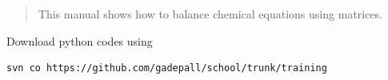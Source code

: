 \documentclass[journal,12pt,twocolumn]{IEEEtran}
\renewcommand\thesection{\arabic{section}}
\begin{document}
%

\begin{abstract}
This manual shows how to balance chemical equations using matrices.
\end{abstract}
Download python codes using 
\begin{lstlisting}
svn co https://github.com/gadepall/school/trunk/training
\end{lstlisting}


\renewcommand{\theequation}{\theenumi}
\end{document}
